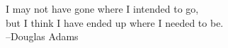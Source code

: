 \thispagestyle{plain}

\vspace*{80mm}
\begin{flushright}
I may not have gone where I intended to go,\\
but I think I have ended up where I needed to be.\\
--Douglas Adams
\end{flushright}
